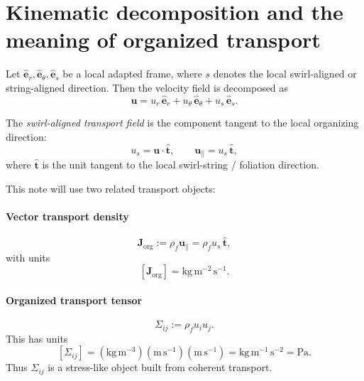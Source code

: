 \documentclass[11pt]{article}
\newcommand{\rhoF}{\rho_{\!f}}
\newcommand{\org}{\mathrm{org}}
\begin{document}
        \section{Kinematic decomposition and the meaning of organized transport}
            
            Let \(\hat{\mathbf e}_r,\hat{\mathbf e}_\theta,\hat{\mathbf e}_s\) be a local adapted frame, where \(s\) denotes the local swirl-aligned or string-aligned direction. Then the velocity field is decomposed as
            \begin{equation}
                \mathbf{u}
                =
                u_r\,\hat{\mathbf e}_r
                +
                u_\theta\,\hat{\mathbf e}_\theta
                +
                u_s\,\hat{\mathbf e}_s.
                \label{eq:u-decomp}
            \end{equation}
            
            The \emph{swirl-aligned transport field} is the component tangent to the local organizing direction:
            \begin{equation}
                u_s = \mathbf{u}\cdot \hat{\mathbf t},
                \qquad
                \mathbf{u}_{\parallel} = u_s\,\hat{\mathbf t},
                \label{eq:us-def}
            \end{equation}
            where \(\hat{\mathbf t}\) is the unit tangent to the local swirl-string / foliation direction.
            
            This note will use two related transport objects:
            
            \paragraph{Vector transport density}
                \begin{equation}
                    \mathbf{J}_{\org} := \rhoF \mathbf{u}_{\parallel}
                    =
                    \rhoF u_s\,\hat{\mathbf t},
                    \label{eq:Jorg}
                \end{equation}
                with units
                \[
                    [\mathbf{J}_{\org}]
                    =
                    \mathrm{kg\,m^{-2}\,s^{-1}}.
                \]
            
            \paragraph{Organized transport tensor}
                \begin{equation}
                    \Sigma_{ij} := \rhoF u_i u_j.
                    \label{eq:Sigmaij}
                \end{equation}
                This has units
                \[
                    [\Sigma_{ij}]
                    =
                    (\mathrm{kg\,m^{-3}})(\mathrm{m\,s^{-1}})(\mathrm{m\,s^{-1}})
                    =
                    \mathrm{kg\,m^{-1}\,s^{-2}}
                    =
                    \mathrm{Pa}.
                \]
                Thus \(\Sigma_{ij}\) is a stress-like object built from coherent transport.
                
\end{document}

